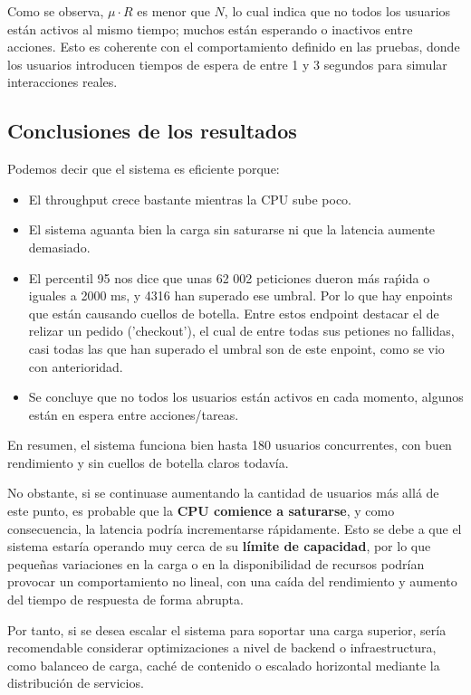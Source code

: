 \documentclass[10pt]{book}
\begin{document}
Como se observa, \(\mu \cdot R\) es menor que \(N\), lo cual indica que no todos los usuarios están activos al mismo tiempo; muchos están esperando o inactivos entre acciones. Esto es coherente con el comportamiento definido en las pruebas, donde los usuarios introducen tiempos de espera de entre 1 y 3 segundos para simular interacciones reales.

\subsection{Conclusiones de los resultados}

Podemos decir que el sistema es eficiente porque:

\begin{itemize}
    \item El throughput crece bastante mientras la CPU sube poco.
    \item El sistema aguanta bien la carga sin saturarse ni que la latencia aumente demasiado.
    \item El percentil 95 nos dice que unas 62 002 peticiones dueron más raṕida o iguales a 2000 ms, y 4316 han superado ese umbral. Por lo que hay enpoints que están causando cuellos de botella. Entre estos endpoint destacar el de relizar un pedido ('checkout'), el cual de entre todas sus petiones no fallidas, casi todas las que han superado el umbral son de este enpoint, como se vio con anterioridad.
    \item Se concluye que no todos los usuarios están activos en cada momento, algunos están en espera entre acciones/tareas.
\end{itemize}

En resumen, el sistema funciona bien hasta 180 usuarios concurrentes, con buen rendimiento y sin cuellos de botella claros todavía.

No obstante, si se continuase aumentando la cantidad de usuarios más allá de este punto, es probable que la \textbf{CPU comience a saturarse}, y como consecuencia, la latencia podría incrementarse rápidamente. Esto se debe a que el sistema estaría operando muy cerca de su \textbf{límite de capacidad}, por lo que pequeñas variaciones en la carga o en la disponibilidad de recursos podrían provocar un comportamiento no lineal, con una caída del rendimiento y aumento del tiempo de respuesta de forma abrupta.

Por tanto, si se desea escalar el sistema para soportar una carga superior, sería recomendable considerar optimizaciones a nivel de backend o infraestructura, como balanceo de carga, caché de contenido o escalado horizontal mediante la distribución de servicios.
\end{document}
